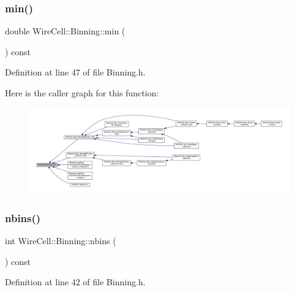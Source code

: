 \subsubsection{\texorpdfstring{min()}{min()}}
{\footnotesize\ttfamily double Wire\+Cell\+::\+Binning\+::min (\begin{DoxyParamCaption}{ }\end{DoxyParamCaption}) const\hspace{0.3cm}{\ttfamily [inline]}}



Definition at line 47 of file Binning.\+h.

Here is the caller graph for this function\+:
\nopagebreak
\begin{figure}[H]
\begin{center}
\leavevmode
\includegraphics[width=350pt]{class_wire_cell_1_1_binning_a5c7eadf5a87f443a18b93d18f1707372_icgraph}
\end{center}
\end{figure}
\mbox{\label{class_wire_cell_1_1_binning_aaac66033ecc76a899c18f8f09404c419}} 
\subsubsection{\texorpdfstring{nbins()}{nbins()}}
{\footnotesize\ttfamily int Wire\+Cell\+::\+Binning\+::nbins (\begin{DoxyParamCaption}{ }\end{DoxyParamCaption}) const\hspace{0.3cm}{\ttfamily [inline]}}



Definition at line 42 of file Binning.\+h.

